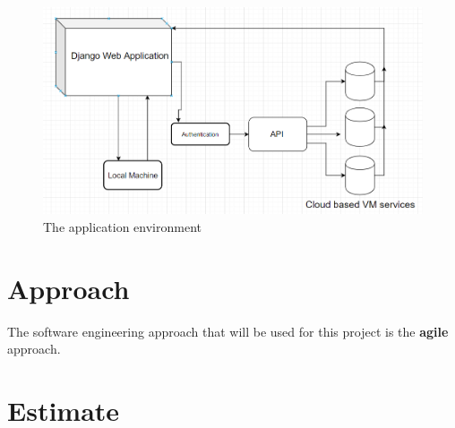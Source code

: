 \documentclass{article}
\begin{document}
    \begin{figure}[h]
    \includegraphics[scale=.7]{diagram}
        \caption{The application environment}
    \end{figure}

    \section{Approach}
    The software engineering approach that will be used for this project is the \textbf{agile} approach.

    \section{Estimate}

%
\end{document}
